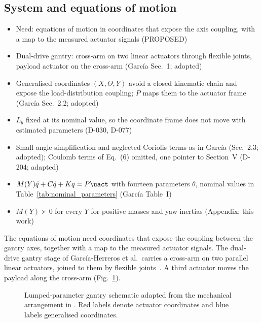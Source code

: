 \subsection{System and equations of motion}\label{sec:system}
\ifdraft
\begin{itemize}
\item Need: equations of motion in coordinates that expose the axis coupling, with a map to the measured actuator signals (PROPOSED)
\item Dual-drive gantry: cross-arm on two linear actuators through flexible joints, payload actuator on the cross-arm (Garc\'ia Sec.~1; adopted)
\item Generalised coordinates $(X,\Theta,Y)$ avoid a closed kinematic chain and expose the load-distribution coupling; $P$ maps them to the actuator frame (Garc\'ia Sec.~2.2; adopted)
\item $L_b$ fixed at its nominal value, so the coordinate frame does not move with estimated parameters (D-030, D-077)
\item Small-angle simplification and neglected Coriolis terms as in Garc\'ia (Sec.~2.3; adopted); Coulomb terms of Eq.~(6) omitted, one pointer to Section~V (D-204; adapted)
\item $M(Y)\ddot q+C\dot q+Kq=P\uact$ with fourteen parameters $\theta$, nominal values in Table~\ref{tab:nominal_parameters} (Garc\'ia Table~I)
\item $M(Y)\succ0$ for every $Y$ for positive masses and yaw inertias (Appendix; this work)
\end{itemize}
\fi

The equations of motion need coordinates that expose the coupling between the
gantry axes, together with a map to the measured actuator signals.
The dual-drive gantry stage of Garc\'ia-Herreros et al.\ carries a cross-arm on
two parallel linear actuators, joined to them by flexible
joints~\cite[Sec.~1]{garcia2013model}.
A third actuator moves the payload along the cross-arm
(Fig.~\ref{fig:gantry_system}).

\begin{figure}[b]
  \centering
  \def\gantryabsorber{0}%
  \resizebox{\columnwidth}{!}{}
  \caption{Lumped-parameter gantry schematic adapted from the mechanical
  arrangement in \cite{garcia2013model}. Red labels denote actuator coordinates
  and blue labels generalised coordinates.}
  \label{fig:gantry_system}
\end{figure}

